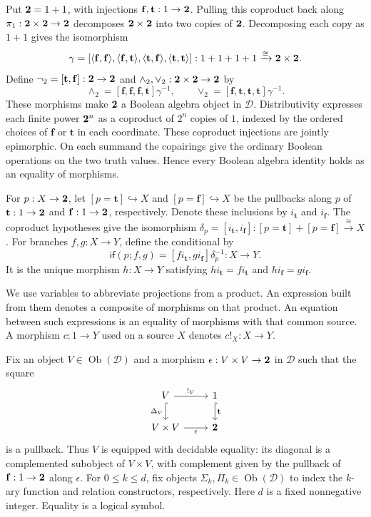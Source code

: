 Put $\mathbf 2=1+1$, with injections
$\mathbf{f},\mathbf{t}:1\to\mathbf 2$. Pulling this coproduct back along
$\pi_1:\mathbf 2\times\mathbf 2\to\mathbf 2$ decomposes $\mathbf 2\times\mathbf 2$ into two copies of
$\mathbf 2$. Decomposing each copy as $1+1$ gives the isomorphism
\[
 \gamma=[\langle\mathbf{f},\mathbf{f}\rangle,
          \langle\mathbf{f},\mathbf{t}\rangle,
          \langle\mathbf{t},\mathbf{f}\rangle,
          \langle\mathbf{t},\mathbf{t}\rangle]:
          1+1+1+1\xrightarrow{\cong}\mathbf 2\times\mathbf 2.
\]
Define $\neg_2=[\mathbf{t},\mathbf{f}]:\mathbf 2\to\mathbf 2$ and
$\wedge_2,\vee_2:\mathbf 2\times\mathbf 2\to\mathbf 2$ by
\[
 \wedge_2=[\mathbf{f},\mathbf{f},\mathbf{f},\mathbf{t}]\gamma^{-1},
 \qquad
 \vee_2=[\mathbf{f},\mathbf{t},\mathbf{t},\mathbf{t}]\gamma^{-1}.
\]
These morphisms make $\mathbf 2$ a Boolean algebra object in $\mathcal D$.
Distributivity expresses each finite power $\mathbf 2^n$ as a
coproduct of $2^n$ copies of $1$, indexed by the ordered choices of
$\mathbf{f}$ or $\mathbf{t}$ in each coordinate. These
coproduct injections are jointly epimorphic. On each summand the
copairings give the ordinary Boolean operations on the two truth values.
Hence every Boolean algebra identity holds as an equality of morphisms.

For $p:X\to\mathbf 2$, let $[p=\mathbf{t}]\hookrightarrow X$ and
$[p=\mathbf{f}]\hookrightarrow X$ be the pullbacks along $p$ of
$\mathbf{t}:1\to\mathbf 2$ and $\mathbf{f}:1\to\mathbf 2$, respectively.
Denote these inclusions by $i_{\mathbf{t}}$ and $i_{\mathbf{f}}$.
The coproduct hypotheses give the isomorphism
$\delta_p=[i_{\mathbf{t}},i_{\mathbf{f}}]:
[p=\mathbf{t}]+[p=\mathbf{f}]\xrightarrow{\cong}X$.
For branches $f,g:X\to Y$, define the conditional by
\[
 \mathsf{if}(p;f,g)=
 [f i_{\mathbf{t}},g i_{\mathbf{f}}]\delta_p^{-1}:X\to Y.
\]
It is the unique morphism $h:X\to Y$ satisfying
$h i_{\mathbf{t}}=f i_{\mathbf{t}}$ and
$h i_{\mathbf{f}}=g i_{\mathbf{f}}$.

We use variables to abbreviate projections from a product.
An expression built from them denotes a composite of morphisms on
that product. An equation between such expressions is an equality
of morphisms with that common source. A morphism $c:1\to Y$ used
on a source $X$ denotes $c!_X:X\to Y$.

Fix an object $V\in\operatorname{Ob}(\mathcal D)$ and a morphism
$\epsilon:V\times V\to\mathbf 2$ in $\mathcal D$ such that the square
\[
\begin{tikzcd}
 V\arrow[r,"{!_V}"]\arrow[d,hook,"\Delta_V"'] &
 1\arrow[d,hook,"\mathbf{t}"]\\
 V\times V\arrow[r,"\epsilon"'] & \Two
\end{tikzcd}
\]
is a pullback. Thus $V$ is equipped with decidable equality:
its diagonal is a complemented subobject of $V\times V$, with
complement given by the pullback of $\mathbf{f}:1\to\mathbf 2$
along $\epsilon$.
For $0\leq k\leq d$, fix objects
$\Sigma_k,\Pi_k\in\operatorname{Ob}(\mathcal D)$ to index the
$k$-ary function and relation constructors, respectively.
Here $d$ is a fixed nonnegative integer. Equality is a logical symbol.

